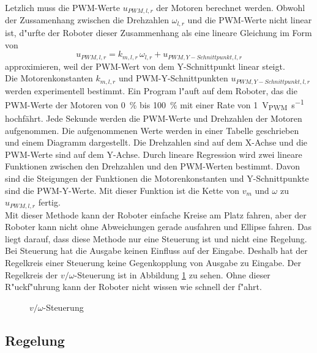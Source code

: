 Letzlich muss die PWM-Werte \(u_{PWM,l,r}\) der Motoren berechnet werden. Obwohl der Zussamenhang zwischen die Drehzahlen \(\omega_{l,r}\) und die PWM-Werte nicht linear ist, d"urfte der Roboter dieser Zusammenhang als eine lineare Gleichung im Form von
\begin{equation}
    u_{PWM,l,r} = k_{m,l,r} \, \omega_{l,r} + u_{PWM,Y-Schnittpunkt,l,r}
\end{equation}
approximieren, weil der PWM-Wert von dem Y-Schnittpunkt linear steigt. \\

Die Motorenkonstanten \(k_{m,l,r}\) und PWM-Y-Schnittpunkten \(u_{PWM,Y-Schnittpunkt,l,r}\) werden experimentell bestimmt. Ein Program l"auft auf dem Roboter, das die PWM-Werte der Motoren von \si{0\percent} bis \si{100\percent} mit einer Rate von \si{1 \volt_{PWM}\per\second} hochfährt. Jede Sekunde werden die PWM-Werte und Drehzahlen der Motoren aufgenommen. Die aufgenommenen Werte werden in einer Tabelle geschrieben und einem Diagramm dargestellt. Die Drehzahlen sind auf dem X-Achse und die PWM-Werte sind auf dem Y-Achse. Durch lineare Regression wird zwei lineare Funktionen zwischen den Drehzahlen und den PWM-Werten bestimmt. Davon sind die Steigungen der Funktionen die Motorenkonstanten und Y-Schnittpunkte sind die PWM-Y-Werte. Mit dieser Funktion ist die Kette von \(v_m\) und \(\omega\) zu \(u_{PWM,l,r}\) fertig. \\

Mit dieser Methode kann der Roboter einfache Kreise am Platz fahren, aber der Roboter kann nicht ohne Abweichungen gerade  ausfahren und Ellipse fahren. Das liegt darauf, dass diese Methode nur eine Steuerung ist und nicht eine Regelung. Bei Steuerung hat die Ausgabe keinen Einfluss auf der Eingabe. Deshalb hat der Regelkreis einer Steuerung keine Gegenkopplung von Ausgabe zu Eingabe. Der Regelkreis der \(v/\omega\)-Steuerung ist in Abbildung \ref{fig:steuerung} zu sehen. Ohne dieser R"uckf"uhrung kann der Roboter nicht wissen wie schnell der f"ahrt. \\

\begin{figure}
    \centering
    
    \caption{\(v/\omega\)-Steuerung}
    \label{fig:steuerung}
\end{figure}


\subsection{Regelung}

